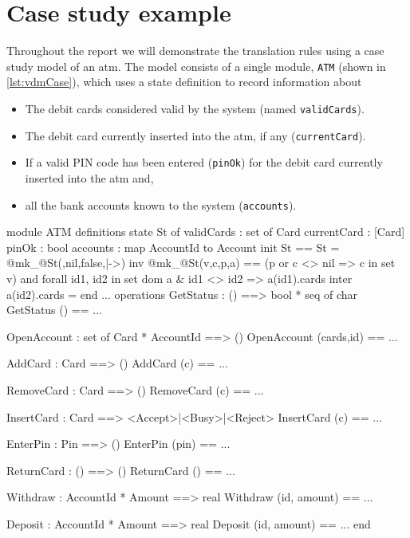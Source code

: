 \section{Case study example}
\label{sec:case}

Throughout the report we will demonstrate the translation rules using a
case study model of an \ac{atm}. The model consists of a single
module, \texttt{ATM} (shown in \autoref{lst:vdmCase}), which uses a
state definition to record information about

\begin{itemize}

\item The debit cards considered valid by the system (named
  \texttt{validCards}).

\item The debit card currently inserted into the \ac{atm}, if any
  (\texttt{currentCard}).

\item If a valid PIN code has been entered (\texttt{pinOk}) for the
  debit card currently inserted into the \ac{atm} and,

\item all the bank accounts known to the system (\texttt{accounts}).

\end{itemize}

\begin{vdmsl}[style=customVdm,caption={\ac{vdmsl} module representing
an \ac{atm}.},label={lst:vdmCase}]
module ATM
definitions
state St of
 validCards : set of Card
 currentCard : [Card]
 pinOk : bool
 accounts : map AccountId to Account
 init St == St = @mk_@St({},nil,false,{|->})
 inv @mk_@St(v,c,p,a) ==
  (p or c <> nil => c in set v)
  and
  forall id1, id2 in set dom a &
   id1 <> id2 =>
   a(id1).cards inter a(id2).cards = {}
end
 ...
operations
GetStatus : () ==> bool * seq of char
GetStatus () == ...

OpenAccount : set of Card * AccountId ==> ()
OpenAccount (cards,id) == ...

AddCard : Card ==> ()
AddCard (c) == ...

RemoveCard : Card ==> ()
RemoveCard (c) == ...

InsertCard : Card ==>
  <Accept>|<Busy>|<Reject>  
InsertCard (c) == ...

EnterPin : Pin ==> ()
EnterPin (pin) == ...

ReturnCard : () ==> ()
ReturnCard () == ...

Withdraw : AccountId * Amount ==> real
Withdraw (id, amount) == ...

Deposit : AccountId * Amount ==> real
Deposit (id, amount) == ...
end
\end{vdmsl}

